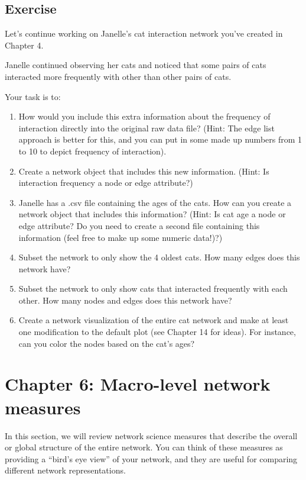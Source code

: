\documentclass[
]{book}
\begin{document}
\section{Exercise}\label{exercise-5}

Let's continue working on Janelle's cat interaction network you've created in Chapter 4.

Janelle continued observing her cats and noticed that some pairs of cats interacted more frequently with other than other pairs of cats.

Your task is to:

\begin{enumerate}
\def\labelenumi{\arabic{enumi}.}
\item
  How would you include this extra information about the frequency of interaction directly into the original raw data file? (Hint: The edge list approach is better for this, and you can put in some made up numbers from 1 to 10 to depict frequency of interaction).
\item
  Create a network object that includes this new information. (Hint: Is interaction frequency a node or edge attribute?)
\item
  Janelle has a .csv file containing the ages of the cats. How can you create a network object that includes this information? (Hint: Is cat age a node or edge attribute? Do you need to create a second file containing this information (feel free to make up some numeric data!)?)
\item
  Subset the network to only show the 4 oldest cats. How many edges does this network have?
\item
  Subset the network to only show cats that interacted frequently with each other. How many nodes and edges does this network have?
\item
  Create a network visualization of the entire cat network and make at least one modification to the default plot (see Chapter 14 for ideas). For instance, can you color the nodes based on the cat's ages?
\end{enumerate}

\chapter{Chapter 6: Macro-level network measures}\label{ch6}

In this section, we will review network science measures that describe the overall or global structure of the entire network. You can think of these measures as providing a ``bird's eye view'' of your network, and they are useful for comparing different network representations.
\end{document}
